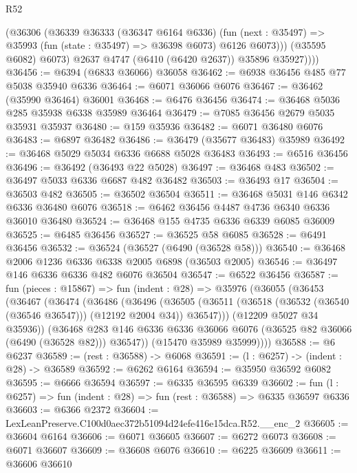 \begin{lexlean}{R52}
\begin{coremodule}
              (@36306
                (@36339
                  @36333
                  (@36347 @6164 @6336)
                  (fun (next : @35497) =>
                  @35993 (fun (state : @35497) => @36398 @6073) @6126 @6073)))
              (@35595 @6082)
              @6073)
            @2637
            @4747
            (@6410 (@6420 @2637))
            @35896
            @35927))))
@36456 := @6394 (@6833 @36066) @36058
@36462 := @6938 @36456 @485 @77 @5038 @35940 @6336
@36464 := @6071 @36066 @6076
@36467 := @36462 (@35990 @36464) @36001
@36468 := @6476 @36456
@36474 := @36468 @5036 @285 @35938 @6338 @35989 @36464
@36479 := @7085 @36456 @2679 @5035 @35931 @35937
@36480 := @159 @35936
@36482 := @6071 @36480 @6076
@36483 := @6897 @36482
@36486 := @36479 (@35677 @36483) @35989
@36492 := @36468 @5029 @5034 @6336 @6688 @5028 @36483
@36493 := @6516 @36456
@36496 := @36492 (@36493 @22 @5028)
@36497 := @36468 @483
@36502 := @36497 @5033 @6336 @6687 @482 @36482
@36503 := @36493 @17
@36504 := @36503 @482
@36505 := @36502 @36504
@36511 := @36468 @5031 @146 @6342 @6336 @36480 @6076
@36518 := @6462 @36456 @4487 @4736 @6340 @6336 @36010 @36480
@36524 := @36468 @155 @4735 @6336 @6339 @6085 @36009
@36525 := @6485 @36456
@36527 := @36525 @58 @6085
@36528 := @6491 @36456
@36532 := @36524 (@36527 (@6490 (@36528 @58)))
@36540 := @36468 @2006 @1236 @6336 @6338 @2005 @6898 (@36503 @2005)
@36546 := @36497 @146 @6336 @6336 @482 @6076 @36504
@36547 := @6522 @36456
@36587 := fun (pieces : @15867) =>
  fun (indent : @28) =>
  @35976
    (@36055
      (@36453
        (@36467
          (@36474
            (@36486
              (@36496
                (@36505
                  (@36511 (@36518 (@36532 (@36540 (@36546 @36547))) (@12192 @2004 @34)) @36547)))
              (@12209 @5027 @34 @35936))
            (@36468
              @283
              @146
              @6336
              @6336
              @36066
              @6076
              (@36525 @82 @36066 (@6490 (@36528 @82)))
              @36547))
          (@15470 @35989 @35999))))
@36588 := @6 @6237
@36589 := (rest : @36588) -> @6068
@36591 := (l : @6257) -> (indent : @28) -> @36589
@36592 := @6262 @6164
@36594 := @35950 @36592 @6082
@36595 := @6666 @36594
@36597 := @6335 @36595 @6339
@36602 := fun (l : @6257) => fun (indent : @28) => fun (rest : @36588) => @6335 @36597 @6336
@36603 := @6366 @2372
@36604 := LexLeanPreserve.C100d0aec372b51094d24efe416e15dca.R52.__enc_2
@36605 := @36604 @6164
@36606 := @6071 @36605
@36607 := @6272 @6073
@36608 := @6071 @36607
@36609 := @36608 @6076
@36610 := @6225 @36609
@36611 := @36606 @36610

\end{coremodule}
\end{lexlean}
